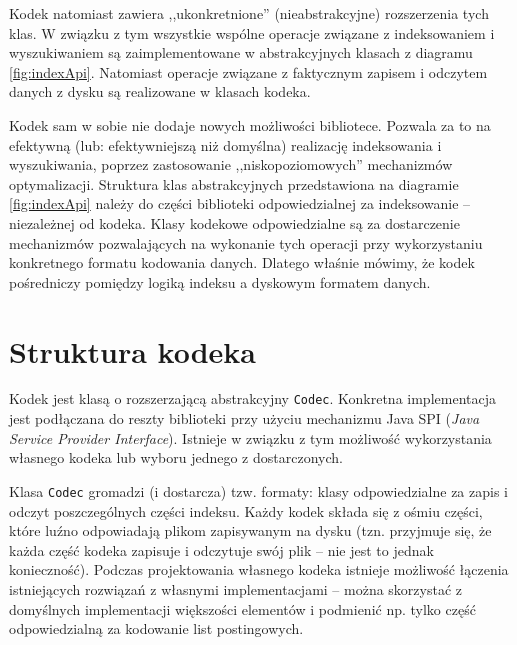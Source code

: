 Kodek natomiast zawiera ,,ukonkretnione'' (nieabstrakcyjne) rozszerzenia tych klas. W związku z tym wszystkie wspólne operacje związane z indeksowaniem i wyszukiwaniem są zaimplementowane w abstrakcyjnych klasach z diagramu \ref{fig:indexApi}. Natomiast operacje związane z faktycznym zapisem i odczytem danych z dysku są realizowane w klasach kodeka. 

Kodek sam w sobie nie dodaje nowych możliwości bibliotece. Pozwala za to na efektywną (lub: efektywniejszą niż domyślna) realizację indeksowania i wyszukiwania, poprzez zastosowanie ,,niskopoziomowych'' mechanizmów optymalizacji. Struktura klas abstrakcyjnych przedstawiona na diagramie \ref{fig:indexApi} należy do części biblioteki odpowiedzialnej za indeksowanie -- niezależnej od kodeka. Klasy kodekowe odpowiedzialne są za dostarczenie mechanizmów pozwalających na wykonanie tych operacji przy wykorzystaniu konkretnego formatu kodowania danych. Dlatego właśnie mówimy, że kodek pośredniczy pomiędzy logiką indeksu a dyskowym formatem danych.

\section{Struktura kodeka}
\label{sec:codecStructure}

Kodek jest klasą o rozszerzającą abstrakcyjny \texttt{Codec}. Konkretna implementacja jest podłączana do reszty biblioteki przy użyciu mechanizmu Java SPI (\emph{Java Service Provider Interface}). Istnieje w związku z tym możliwość wykorzystania własnego kodeka lub wyboru jednego z dostarczonych.

Klasa \texttt{Codec} gromadzi (i dostarcza) tzw. formaty: klasy odpowiedzialne za zapis i odczyt poszczególnych części indeksu. Każdy kodek składa się z ośmiu części, które luźno odpowiadają plikom zapisywanym na dysku (tzn. przyjmuje się, że każda część kodeka zapisuje i odczytuje swój plik -- nie jest to jednak konieczność). Podczas projektowania własnego kodeka istnieje możliwość łączenia istniejących rozwiązań z własnymi implementacjami -- można skorzystać z domyślnych implementacji większości elementów i podmienić np. tylko część odpowiedzialną za kodowanie list postingowych.

